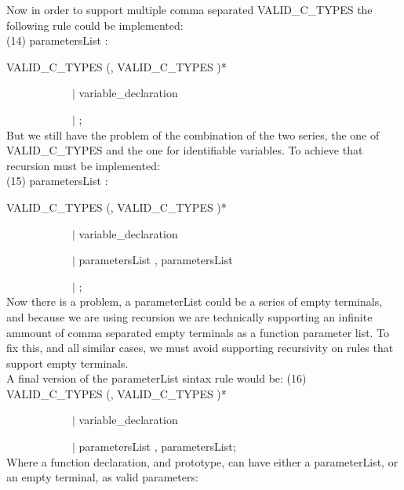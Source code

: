 \documentclass[twocolumn,10ptr]{article}
\begin{document}
	Now in order to support multiple comma separated VALID\_C\_TYPES the following rule could be implemented:\\
	
	(14) parametersList : 
	
	VALID\_C\_TYPES   (\textsc{},\textsc{} VALID\_C\_TYPES )*
	
	\ \ \ \ \ \ \ \ \ \ \ \      \(\mid\) variable\_declaration
	
	\ \ \ \ \ \ \ \ \ \ \ \   	\(\mid\) ;\\
	
	But we still have the problem of the combination of the two series, the one of VALID\_C\_TYPES and the one for identifiable variables.
	To achieve that recursion must be implemented:\\
	
	(15) parametersList :
	
	VALID\_C\_TYPES   (\textsc{},\textsc{} VALID\_C\_TYPES )*
	
	\ \ \ \ \ \ \ \ \ \ \ \      \(\mid\) variable\_declaration
	
	\ \ \ \ \ \ \ \ \ \ \ \      \(\mid\)  parametersList \textsc{},\textsc{}  parametersList
	
	\ \ \ \ \ \ \ \ \ \ \ \   	\(\mid\) ;\\
	
	Now there is a problem, a parameterList could be a series of empty terminals, and because we are using recursion we are technically supporting an infinite ammount of comma separated empty terminals as a function parameter list. To fix this, and all similar cases, we must avoid supporting recursivity on rules that support empty terminals.\\
	
	A final version of the parameterList sintax rule would be: (16)\\
	
	VALID\_C\_TYPES   (\textsc{},\textsc{} VALID\_C\_TYPES )*
	
	\ \ \ \ \ \ \ \ \ \ \ \      \(\mid\) variable\_declaration
	
	\ \ \ \ \ \ \ \ \ \ \ \      \(\mid\)  parametersList \textsc{},\textsc{}  parametersList;\\
	
	Where a function declaration, and prototype, can have either a parameterList, or an empty terminal, as valid parameters:\\
	
\end{document}
